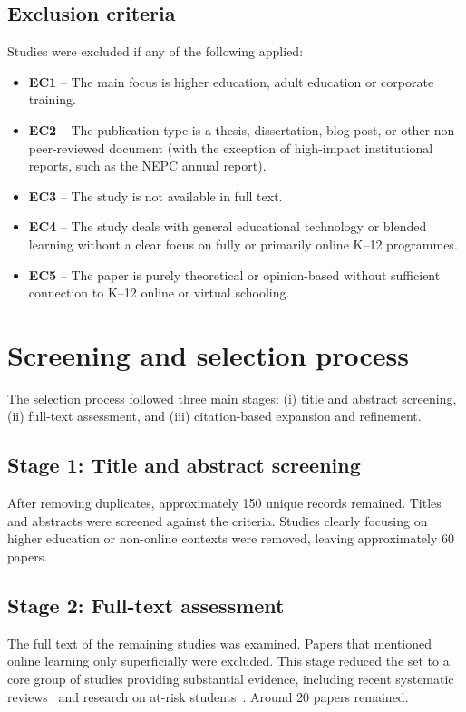 \subsection{Exclusion criteria}
Studies were excluded if any of the following applied:
\begin{itemize}
    \item \textbf{EC1} -- The main focus is higher education, adult education or corporate training.
    \item \textbf{EC2} -- The publication type is a thesis, dissertation, blog post, or other non-peer-reviewed document (with the exception of high-impact institutional reports, such as the NEPC annual report).
    \item \textbf{EC3} -- The study is not available in full text.
    \item \textbf{EC4} -- The study deals with general educational technology or blended learning without a clear focus on fully or primarily online K--12 programmes.
    \item \textbf{EC5} -- The paper is purely theoretical or opinion-based without sufficient connection to K--12 online or virtual schooling.
\end{itemize}

\section{Screening and selection process}
The selection process followed three main stages: (i) title and abstract screening, (ii) full-text assessment, and (iii) citation-based expansion and refinement.

\subsection{Stage 1: Title and abstract screening}
After removing duplicates, approximately 150 unique records remained. Titles and abstracts were screened against the criteria. Studies clearly focusing on higher education or non-online contexts were removed, leaving approximately 60 papers.

\subsection{Stage 2: Full-text assessment}
The full text of the remaining studies was examined. Papers that mentioned online learning only superficially were excluded. This stage reduced the set to a core group of studies providing substantial evidence, including recent systematic reviews~\cite{martin_systematic_2020,online_johnson_2022} and research on at-risk students~\cite{beck_atrisk_2024,beck_advocate_2020}. Around 20 papers remained.

